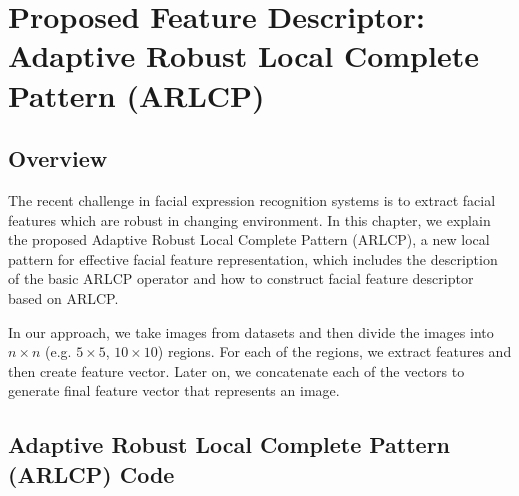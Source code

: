 \documentclass[12pt]{article}
\begin{document}
\newpage
\section{ Proposed Feature Descriptor: Adaptive Robust Local Complete Pattern (ARLCP)}



\subsection{ Overview }
The recent challenge in facial expression recognition systems is to extract facial features which are robust in changing environment. In this chapter, we explain the proposed Adaptive Robust Local Complete Pattern (ARLCP), a new local pattern for effective facial feature representation, which includes the description of the basic ARLCP operator and how to construct facial feature descriptor based on ARLCP.



In our approach, we take images from datasets and then divide the images into $n \times n$ (e.g. $5 \times 5$,  $10 \times 10$) regions. For each of the regions, we extract features and then create feature vector. Later on, we concatenate each of the vectors to generate final feature vector that represents an image. 





\subsection{Adaptive Robust Local Complete Pattern (ARLCP) Code}
\end{document}
